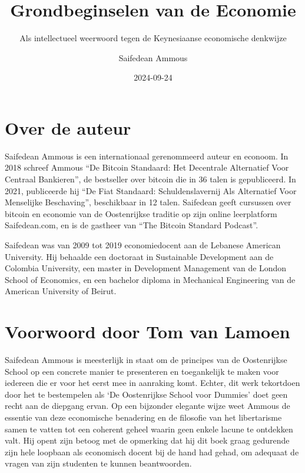 \documentclass[
  a5paper,
  smalldemyvopaper,11pt,twoside,onecolumn,openright,extrafontsizes,
hidelinks]{memoir}
\title{Grondbeginselen van de Economie}
\subtitle{Als intellectueel weerwoord tegen de Keynesiaanse economische
denkwijze}
\author{Saifedean Ammous}
\date{2024-09-24}
\renewcommand*\contentsname{Inhoudsopgave}
\newcommand\contentsname{Inhoudsopgave}
\begin{document}
\frontmatter
\maketitle

\renewcommand*\contentsname{Inhoudsopgave}
{
\setcounter{tocdepth}{0}
\tableofcontents
}

\mainmatter
{}

\chapter*{Over de auteur}\label{over-de-auteur}


Saifedean Ammous is een internationaal gerenommeerd auteur en econoom.
In 2018 schreef Ammous ``De Bitcoin Standaard: Het Decentrale
Alternatief Voor Centraal Bankieren'', de bestseller over bitcoin die in
36 talen is gepubliceerd. In 2021, publiceerde hij ``De Fiat Standaard:
Schuldenslavernij Als Alternatief Voor Menselijke Beschaving'',
beschikbaar in 12 talen. Saifedean geeft cursussen over bitcoin en
economie van de Oostenrijkse traditie op zijn online leerplatform
Saifedean.com, en is de gastheer van ``The Bitcoin Standard Podcast''.

Saifedean was van 2009 tot 2019 economiedocent aan de Lebanese American
University. Hij behaalde een doctoraat in Sustainable Development aan de
Colombia University, een master in Development Management van de London
School of Economics, en een bachelor diploma in Mechanical Engineering
van de American University of Beirut.


\chapter*{Voorwoord door Tom van
Lamoen}\label{voorwoord-door-tom-van-lamoen}


Saifedean Ammous is meesterlijk in staat om de principes van de
Oostenrijkse School op een concrete manier te presenteren en
toegankelijk te maken voor iedereen die er voor het eerst mee in
aanraking komt. Echter, dit werk tekortdoen door het te bestempelen als
`De Oostenrijkse School voor Dummies' doet geen recht aan de diepgang
ervan. Op een bijzonder elegante wijze weet Ammous de essentie van deze
economische benadering en de filosofie van het libertarisme samen te
vatten tot een coherent geheel waarin geen enkele lacune te ontdekken
valt. Hij opent zijn betoog met de opmerking dat hij dit boek graag
gedurende zijn hele loopbaan als economisch docent bij de hand had
gehad, om adequaat de vragen van zijn studenten te kunnen beantwoorden.
\end{document}
